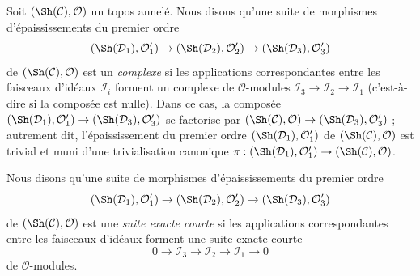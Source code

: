 \begin{remark}
\label{remark-short-exact-sequence-thickenings-ringed-topoi}
Soit $(\Sh(\mathcal{C}), \mathcal{O})$ un topos annelé.
Nous disons qu'une suite de morphismes d'épaississements du premier ordre
$$
(\Sh(\mathcal{D}_1), \mathcal{O}'_1) \to
(\Sh(\mathcal{D}_2), \mathcal{O}'_2) \to
(\Sh(\mathcal{D}_3), \mathcal{O}'_3)
$$
de $(\Sh(\mathcal{C}), \mathcal{O})$ est un {\it complexe} si les applications
correspondantes entre les faisceaux d'idéaux $\mathcal{I}_i$ forment un
complexe de $\mathcal{O}$-modules
$\mathcal{I}_3 \to \mathcal{I}_2 \to \mathcal{I}_1$ (c'est-à-dire si la
composée est nulle). Dans ce cas, la composée
$(\Sh(\mathcal{D}_1), \mathcal{O}'_1) \to
(\Sh(\mathcal{D}_3), \mathcal{O}'_3)$ se factorise par
$(\Sh(\mathcal{C}), \mathcal{O}) \to
(\Sh(\mathcal{D}_3), \mathcal{O}'_3)$ ; autrement dit, l'épaississement du
premier ordre $(\Sh(\mathcal{D}_1), \mathcal{O}'_1)$ de
$(\Sh(\mathcal{C}), \mathcal{O})$ est trivial et muni d'une trivialisation
canonique
$\pi : (\Sh(\mathcal{D}_1), \mathcal{O}'_1) \to
(\Sh(\mathcal{C}), \mathcal{O})$.

\medskip\noindent
Nous disons qu'une suite de morphismes d'épaississements du premier ordre
$$
(\Sh(\mathcal{D}_1), \mathcal{O}'_1) \to
(\Sh(\mathcal{D}_2), \mathcal{O}'_2) \to
(\Sh(\mathcal{D}_3), \mathcal{O}'_3)
$$
de $(\Sh(\mathcal{C}), \mathcal{O})$ est une {\it suite exacte courte} si les
applications correspondantes entre les faisceaux d'idéaux forment une suite
exacte courte
$$
0 \to \mathcal{I}_3 \to \mathcal{I}_2 \to \mathcal{I}_1 \to 0
$$
de $\mathcal{O}$-modules.
\end{remark}

